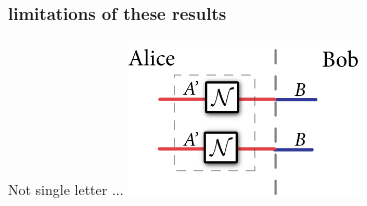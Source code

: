 \documentclass[12pt]{beamer}
\theoremstyle{plain}
\theoremstyle{definition}
\begin{document}
\begin{frame}
	\frametitle{limitations of these results}
	Not single letter ... 
         \includegraphics[height=1.6in]{mark_diagrams/notSingleLetter.png}
\end{frame}


%

%

%








%

%

%
\end{document}
